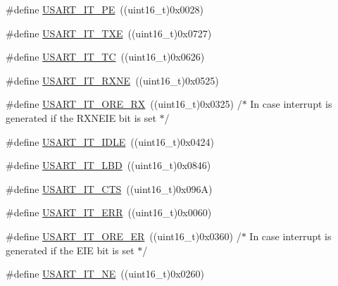 \begin{DoxyCompactItemize}
\item 
\#define \mbox{\hyperlink{group___u_s_a_r_t___interrupt__definition_gae607c28a462c224c575b7541dc4f7067}{U\+S\+A\+R\+T\+\_\+\+I\+T\+\_\+\+PE}}~((uint16\+\_\+t)0x0028)
\item 
\#define \mbox{\hyperlink{group___u_s_a_r_t___interrupt__definition_gab18d0fe889204a4c34f6d5817fb5147d}{U\+S\+A\+R\+T\+\_\+\+I\+T\+\_\+\+T\+XE}}~((uint16\+\_\+t)0x0727)
\item 
\#define \mbox{\hyperlink{group___u_s_a_r_t___interrupt__definition_ga748e86162cc110513330079982821c39}{U\+S\+A\+R\+T\+\_\+\+I\+T\+\_\+\+TC}}~((uint16\+\_\+t)0x0626)
\item 
\#define \mbox{\hyperlink{group___u_s_a_r_t___interrupt__definition_gacdd49b93072655a21a63a35e6431f8ae}{U\+S\+A\+R\+T\+\_\+\+I\+T\+\_\+\+R\+X\+NE}}~((uint16\+\_\+t)0x0525)
\item 
\#define \mbox{\hyperlink{group___u_s_a_r_t___interrupt__definition_gaad8fd44c80b30285dc3088a0b3aa5bd9}{U\+S\+A\+R\+T\+\_\+\+I\+T\+\_\+\+O\+R\+E\+\_\+\+RX}}~((uint16\+\_\+t)0x0325) /$\ast$ In case interrupt is generated if the R\+X\+N\+E\+I\+E bit is set $\ast$/
\item 
\#define \mbox{\hyperlink{group___u_s_a_r_t___interrupt__definition_ga5d85aab24b7b2dfddb61ba2a49fa6185}{U\+S\+A\+R\+T\+\_\+\+I\+T\+\_\+\+I\+D\+LE}}~((uint16\+\_\+t)0x0424)
\item 
\#define \mbox{\hyperlink{group___u_s_a_r_t___interrupt__definition_ga063628e16cdda199b07d380421afc4a5}{U\+S\+A\+R\+T\+\_\+\+I\+T\+\_\+\+L\+BD}}~((uint16\+\_\+t)0x0846)
\item 
\#define \mbox{\hyperlink{group___u_s_a_r_t___interrupt__definition_gab49efbefaca2921e8cbe8f5146e99dbd}{U\+S\+A\+R\+T\+\_\+\+I\+T\+\_\+\+C\+TS}}~((uint16\+\_\+t)0x096\+A)
\item 
\#define \mbox{\hyperlink{group___u_s_a_r_t___interrupt__definition_ga631e83efd4c4789128d80a9539faf78a}{U\+S\+A\+R\+T\+\_\+\+I\+T\+\_\+\+E\+RR}}~((uint16\+\_\+t)0x0060)
\item 
\#define \mbox{\hyperlink{group___u_s_a_r_t___interrupt__definition_ga1faa2d618b7c1038f8cad50fec7d0ba4}{U\+S\+A\+R\+T\+\_\+\+I\+T\+\_\+\+O\+R\+E\+\_\+\+ER}}~((uint16\+\_\+t)0x0360) /$\ast$ In case interrupt is generated if the E\+I\+E bit is set $\ast$/
\item 
\#define \mbox{\hyperlink{group___u_s_a_r_t___interrupt__definition_gad5de042f579b50f1e8643009176486b3}{U\+S\+A\+R\+T\+\_\+\+I\+T\+\_\+\+NE}}~((uint16\+\_\+t)0x0260)

\end{DoxyCompactItemize}
